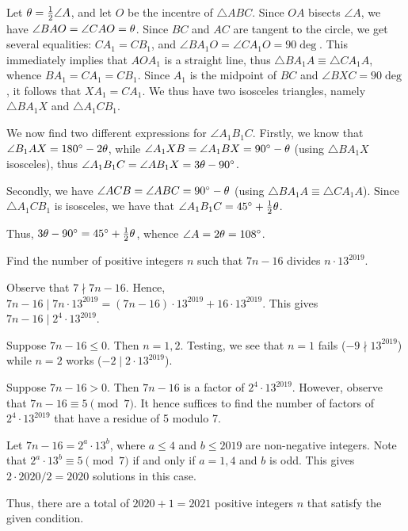\begin{solution*}    
    Let $\theta = \frac12 \angle A$, and let $O$ be the incentre of $\triangle ABC$. Since $OA$ bisects $\angle A$, we have $\angle BAO = \angle CAO = \theta$. Since $BC$ and $AC$ are tangent to the circle, we get several equalities: $C A_1 = C B_1$, and $\angle BA_1 O = \angle CA_1O = 90\deg$. This immediately implies that $AOA_1$ is a straight line, thus $\triangle BA_1 A \equiv \triangle CA_1 A$, whence $BA_1 = CA_1 = C B_1$. Since $A_1$ is the midpoint of $BC$ and $\angle BXC = 90\deg$, it follows that $X A_1 = C A_1$. We thus have two isosceles triangles, namely $\triangle BA_1 X$ and $\triangle A_1 C B_1$.
    
    We now find two different expressions for $\angle A_1 B_1 C$. Firstly, we know that $\angle B_1 A X = 180^{\circ} - 2\theta$, while $\angle A_1XB = \angle A_1 B X = 90^{\circ} - \theta$ (using $\triangle B A_1 X$ isosceles), thus $\angle A_1 B_1 C = \angle AB_1 X = 3\theta - 90^{\circ}$.
    
    Secondly, we have $\angle ACB = \angle ABC = 90^{\circ} - \theta$ (using $\triangle BA_1 A \equiv \triangle CA_1 A$). Since $\triangle A_1 C B_1$ is isosceles, we have that $\angle A_1 B_1 C = 45^{\circ} + \frac12 \theta$.
    
    Thus, $3\theta - 90^{\circ} = 45^{\circ} + \frac12 \theta$, whence $\angle A = 2\theta = 108^{\circ}$.
\end{solution*}

\begin{question}[2021]\label{Q::2021-O-1-22}
    Find the number of positive integers $n$ such that $7n-16$ divides $n \cdot 13^{2019}$.
\end{question}
\begin{solution*}
    Observe that $7 \nmid 7n - 16$. Hence, $7n-16 \mid 7n \cdot 13^{2019} = (7n-16)\cdot13^{2019} + 16 \cdot 13^{2019}$. This gives $7n - 16 \mid 2^4 \cdot 13^{2019}$.

     Suppose $7n-16 \leq 0$. Then $n = 1, 2$. Testing, we see that $n = 1$ fails ($-9 \nmid 13^{2019}$) while $n = 2$ works ($-2 \mid 2 \cdot 13^{2019}$).
    
     Suppose $7n-16 > 0$. Then $7n-16$ is a factor of $2^4 \cdot 13^{2019}$. However, observe that $7n - 16 \equiv 5 \pmod 7$. It hence suffices to find the number of factors of $2^4 \cdot 13^{2019}$ that have a residue of 5 modulo 7.
    
    Let $7n-16 = 2^a \cdot 13^b$, where $a \leq 4$ and $b \leq 2019$ are non-negative integers. Note that $2^a \cdot 13^b \equiv 5 \pmod{7}$ if and only if $a = 1, 4$ and $b$ is odd. This gives $2 \cdot 2020/2 = 2020$ solutions in this case.
    
    Thus, there are a total of $2020 + 1 = 2021$ positive integers $n$ that satisfy the given condition.
\end{solution*}

